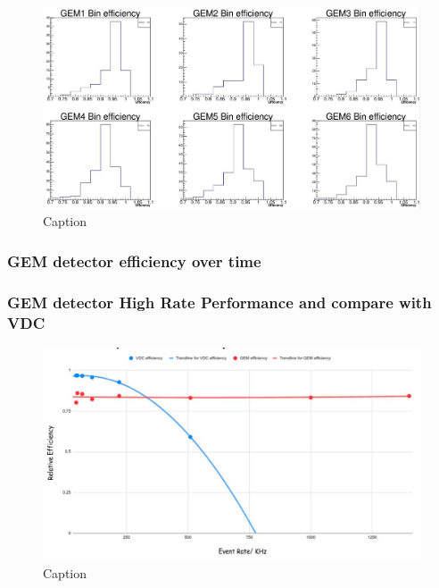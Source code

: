 \begin{figure}[!htbp]
    \centering
    \includegraphics[width=\textwidth]{images/chap5/rhrs_gem_bin_efficiency.png}
    \caption{Caption}
    \label{fig:rhrs_gem_bin_efficiency}
\end{figure}

\subsubsection{GEM detector efficiency over time}
\subsubsection{GEM detector High Rate Performance and compare with VDC}




\begin{figure}[!htbp]
    \centering
    \includegraphics[width=\textwidth]{images/chap5/gem efficiency over time.png}
    \caption{Caption}
    \label{fig:my_label}
\end{figure}
